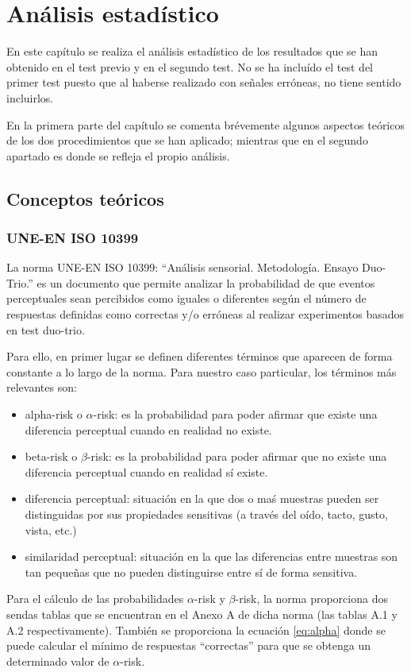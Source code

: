 \documentclass[11pt,a4paper,twoside]{book}
\author{Víctor de Tejada Molera}
\begin{document}
\chapter{Análisis estadístico}    
    En este capítulo se realiza el análisis estadístico de los resultados que se han obtenido en el test previo y en el segundo test. No se ha incluído el test del primer test puesto que al haberse realizado con señales erróneas, no tiene sentido incluirlos.
    
    En la primera parte del capítulo se comenta brévemente algunos aspectos teóricos de los dos procedimientos que se han aplicado; mientras que en el segundo apartado es donde se refleja el propio análisis.
    \section{Conceptos teóricos}    
        \subsection*{UNE-EN ISO 10399}
            La norma UNE-EN ISO 10399: ``Análisis sensorial. Metodología. Ensayo Duo-Trio.''\cite{ISO10399} es un documento que permite analizar la probabilidad de que eventos perceptuales sean percibidos como iguales o diferentes según el número de respuestas definidas como correctas y/o erróneas al realizar experimentos basados en test duo-trio.
        
            Para ello, en primer lugar se definen diferentes términos que aparecen de forma constante a lo largo de la norma. Para nuestro caso particular, los términos más relevantes son:
        
            \begin{itemize}
                \item alpha-risk o $\alpha$-risk: es la probabilidad para poder afirmar que existe una diferencia perceptual cuando en realidad no existe.
                \item beta-risk o $\beta$-risk: es la probabilidad para poder afirmar que no existe una diferencia perceptual cuando en realidad sí existe.
                \item diferencia perceptual: situación en la que dos o maś muestras pueden ser distinguidas por sus propiedades sensitivas (a través del oído, tacto, gusto, vista, etc.)
                \item similaridad perceptual: situación en la que las diferencias entre muestras son tan pequeñas que no pueden distinguirse entre sí de forma sensitiva.
            \end{itemize}
            Para el cálculo de las probabilidades $\alpha$-risk y $\beta$-risk, la norma proporciona dos sendas tablas que se encuentran en el Anexo A de dicha norma (las tablas A.1 y A.2 respectivamente). También se proporciona la ecuación \ref{eq:alpha} donde se puede calcular el mínimo de respuestas ``correctas'' para que se obtenga un determinado valor de $\alpha$-risk.
            
\end{document}
